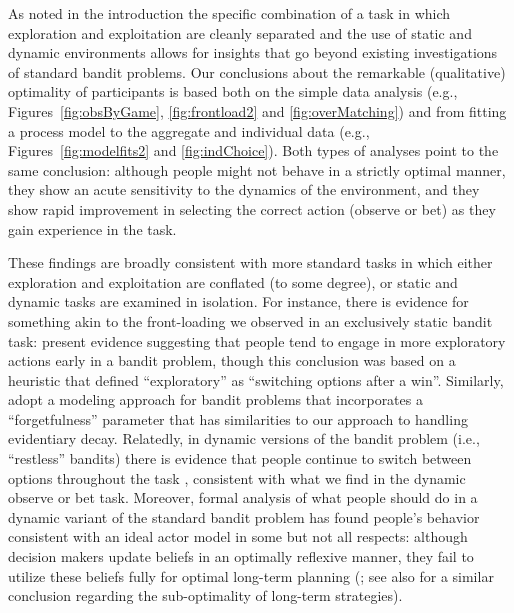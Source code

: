 \documentclass[authoryear]{elsarticle}
\begin{document}
As noted in the introduction the specific combination of a task in which exploration and exploitation are cleanly separated \citep[cf.][]{sang_learning_2011} and the use of static and dynamic environments allows for  insights that go beyond existing investigations of standard bandit problems. Our conclusions about the remarkable (qualitative) optimality of participants is based both on the simple data analysis (e.g., Figures~\ref{fig:obsByGame}, \ref{fig:frontload2} and \ref{fig:overMatching}) and from fitting a process model to the aggregate and individual data (e.g., Figures~\ref{fig:modelfits2} and \ref{fig:indChoice}). Both types of analyses point to the same conclusion: although people might not behave in a strictly optimal manner, they show an acute sensitivity to the dynamics of the environment, and they show rapid improvement in selecting the correct action (observe or bet) as they gain experience in the task.

These findings are broadly consistent with more standard tasks in which either exploration and exploitation are conflated (to some degree), or static and dynamic tasks are examined in isolation.  For instance, there is evidence for something akin to the front-loading we observed in an exclusively static bandit task: \citet{zhang_cheap_2013} present evidence suggesting that people tend to engage in more exploratory actions early in a bandit problem, though this conclusion was based on a heuristic that defined ``exploratory'' as ``switching options after a win''.  Similarly, \citet{zhang_forgetful_2013} adopt a modeling approach for bandit problems that incorporates a ``forgetfulness'' parameter that has similarities to our approach to handling evidentiary decay. Relatedly, in dynamic versions of the bandit problem (i.e.,  ``restless'' bandits) there is evidence that people continue to switch between options throughout the task \citep[e.g.,][]{speekenbrink_uncertainty_2014,speekenbrink_uncertainty_2015}, consistent with what we find in the dynamic observe or bet task. Moreover, formal analysis of what people should do in a dynamic variant of the standard bandit problem has found people's behavior consistent with an ideal actor model in some but not all respects: although decision makers update beliefs in an optimally reflexive manner, they fail to utilize these beliefs fully for optimal long-term planning (\citealp{knox_nature_2011}; see also \citealp{gureckis_learning_2009} for a similar conclusion regarding the sub-optimality of long-term strategies).
\end{document}
